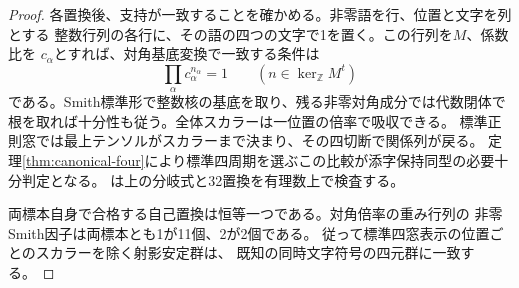\begin{proof}
各置換後、支持が一致することを確かめる。非零語を行、位置と文字を列とする
整数行列の各行に、その語の四つの文字で1を置く。この行列を$M$、係数比を
$c_\alpha$とすれば、対角基底変換で一致する条件は
\[
 \prod_\alpha c_\alpha^{n_\alpha}=1\qquad(n\in\ker_{\mathbb Z}M^t)
\]
である。Smith標準形で整数核の基底を取り、残る非零対角成分では代数閉体で
根を取れば十分性も従う。全体スカラーは一位置の倍率で吸収できる。
標準正則窓では最上テンソルがスカラーまで決まり、その四切断で関係列が戻る。
定理\ref{thm:canonical-four}により標準四周期を選ぶこの比較が添字保持同型の必要十分判定となる。
は上の分岐式と32置換を有理数上で検査する。

両標本自身で合格する自己置換は恒等一つである。対角倍率の重み行列の
非零Smith因子は両標本とも1が11個、2が2個である。
従って標準四窓表示の位置ごとのスカラーを除く射影安定群は、
既知の同時文字符号の四元群に一致する。
\end{proof}
